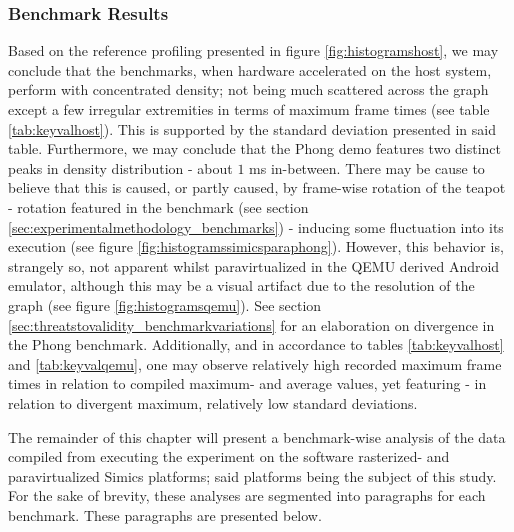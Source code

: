 \subsubsection{Benchmark Results}
\label{sec:results_benchmarkresults}
Based on the reference profiling presented in figure \ref{fig:histogramshost}, we may conclude that the benchmarks, when hardware accelerated on the host system, perform with concentrated density; not being much scattered across the graph except a few irregular extremities in terms of maximum frame times (see table \ref{tab:keyvalhost}).
This is supported by the standard deviation presented in said table.
Furthermore, we may conclude that the Phong demo features two distinct peaks in density distribution - about $1$ ms in-between.
There may be cause to believe that this is caused, or partly caused, by frame-wise rotation of the teapot - rotation featured in the benchmark (see section \ref{sec:experimentalmethodology_benchmarks}) - inducing some fluctuation into its execution (see figure \ref{fig:histogramssimicsparaphong}).
However, this behavior is, strangely so, not apparent whilst paravirtualized in the QEMU derived Android emulator, although this may be a visual artifact due to the resolution of the graph (see figure \ref{fig:histogramsqemu}).
See section \ref{sec:threatstovalidity_benchmarkvariations} for an elaboration on divergence in the Phong benchmark.
Additionally, and in accordance to tables \ref{tab:keyvalhost} and \ref{tab:keyvalqemu}, one may observe relatively high recorded maximum frame times in relation to compiled maximum- and average values, yet featuring - in relation to divergent maximum, relatively low standard deviations.

The remainder of this chapter will present a benchmark-wise analysis of the data compiled from executing the experiment on the software rasterized- and paravirtualized Simics platforms; said platforms being the subject of this study.
For the sake of brevity, these analyses are segmented into paragraphs for each benchmark.
These paragraphs are presented below.

